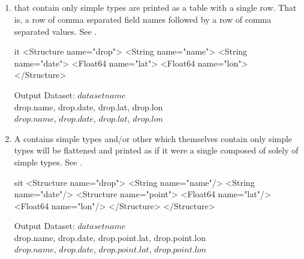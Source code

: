 \documentclass[justify]{dods-paper}
\begin{document}
\subsection{\Structures}
\label{sec-ascii-structure}

\begin{enumerate}
\item \Structures that contain only simple types are printed as a table
  with a single row. That is, a row of comma separated field names
  followed by a row of comma separated values. See .

\begin{minipage}[t]{2.25in}

\begin{vcode}{it}
<Structure name="drop">
  <String name="name">
  <String name="date">
  <Float64 name="lat">
  <Float64 name="lon">
</Structure>
\end{vcode}
\end{minipage}
\begin{minipage}[t]{5in}
\begin{textoutput}{Output}
Dataset: $dataset name$\\
drop.name, drop.date, drop.lat, drop.lon\\
$drop.name$, $drop.date$, $drop.lat$, $drop.lon$
\end{textoutput}
\end{minipage}

\item A \Structure contains simple types and/or other \Structures which
  themselves contain only simple types will be flattened and printed
  as if it were a single \Structure composed of solely of simple types.
  See .

\begin{minipage}[t]{2.25in}

\begin{vcode}{sit}
<Structure name="drop">
  <String name="name"/>
  <String name="date"/>
  <Structure name="point">
    <Float64 name="lat"/>
    <Float64 name="lon"/>
  </Structure>
</Structure>
\end{vcode}
\end{minipage}
\begin{minipage}[t]{5in}
\begin{textoutput}{Output}
Dataset: $dataset name$\\
drop.name, drop.date, drop.point.lat, drop.point.lon\\
$drop.name$, $drop.date$, $drop.point.lat$, $drop.point.lon$
\end{textoutput}
\end{minipage}


\end{enumerate}
\end{document}
